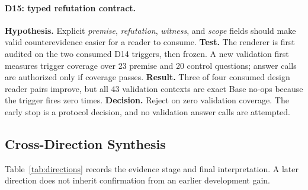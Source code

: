 \documentclass[10pt]{article}
\begin{document}
\paragraph{D15: typed refutation contract.}
\textbf{Hypothesis.} Explicit \emph{premise}, \emph{refutation}, \emph{witness}, and \emph{scope} fields should make valid counterevidence easier for a reader to consume. \textbf{Test.} The renderer is first audited on the two consumed D14 triggers, then frozen. A new validation first measures trigger coverage over 23 premise and 20 control questions; answer calls are authorized only if coverage passes. \textbf{Result.} Three of four consumed design reader pairs improve, but all 43 validation contexts are exact Base no-ops because the trigger fires zero times. \textbf{Decision.} Reject on zero validation coverage. The early stop is a protocol decision, and no validation answer calls are attempted.

\subsection{Cross-Direction Synthesis}

Table~\ref{tab:directions} records the evidence stage and final interpretation. A later direction does not inherit confirmation from an earlier development gain.
\end{document}
